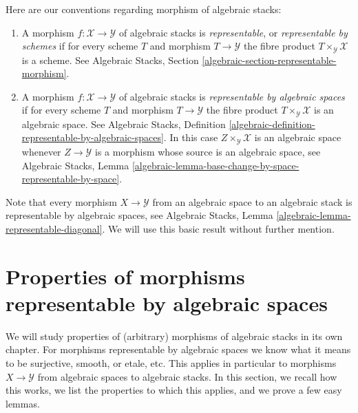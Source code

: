 \medskip\noindent
Here are our conventions regarding morphism of algebraic stacks:
\begin{enumerate}
\item A morphism $f : \mathcal{X} \to \mathcal{Y}$
of algebraic stacks is {\it representable}, or
{\it representable by schemes} if for every scheme
$T$ and morphism $T \to \mathcal{Y}$ the fibre product
$T \times_{\mathcal{Y}} \mathcal{X}$ is a scheme.
See
Algebraic Stacks, Section \ref{algebraic-section-representable-morphism}.
\item A morphism $f : \mathcal{X} \to \mathcal{Y}$
of algebraic stacks is {\it representable by algebraic spaces}
if for every scheme $T$ and morphism $T \to \mathcal{Y}$ the fibre product
$T \times_{\mathcal{Y}} \mathcal{X}$ is an algebraic space.
See Algebraic Stacks,
Definition \ref{algebraic-definition-representable-by-algebraic-spaces}.
In this case $Z \times_{\mathcal{Y}} \mathcal{X}$ is an algebraic
space whenever $Z \to \mathcal{Y}$ is a morphism whose source is
an algebraic space, see
Algebraic Stacks,
Lemma \ref{algebraic-lemma-base-change-by-space-representable-by-space}.
\end{enumerate}
Note that every morphism $X \to \mathcal{Y}$ from an algebraic space
to an algebraic stack is representable by algebraic spaces, see
Algebraic Stacks, Lemma \ref{algebraic-lemma-representable-diagonal}.
We will use this basic result without further mention.




\section{Properties of morphisms representable by algebraic spaces}
\label{section-properties-morphisms}

\noindent
We will study properties of (arbitrary) morphisms of algebraic stacks in its
own chapter. For morphisms representable by algebraic spaces we know what
it means to be surjective, smooth, or etale, etc. This applies in particular
to morphisms $X \to \mathcal{Y}$ from algebraic spaces to algebraic stacks.
In this section, we recall how this works, we list the properties to which
this applies, and we prove a few easy lemmas.

